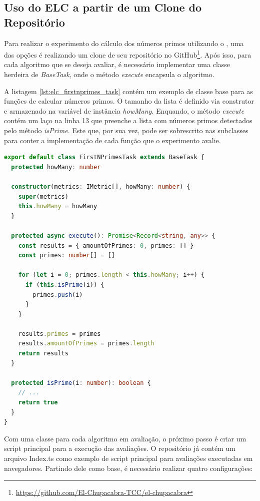 \documentclass[12pt]{tcc}
\begin{document}
	\subsection{Uso do ELC a partir de um Clone do Repositório}
	\label{subsection:study-case-cloning-elc}

	Para realizar o experimento do cálculo dos números primos utilizando o , uma das opções é realizando um clone de seu repositório no GitHub\footnote{\url{https://github.com/El-Chupacabra-TCC/el-chupacabra}}.
	Após isso, para cada algoritmo que se deseja avaliar, é necessário implementar uma classe herdeira de \emph{BaseTask}, onde o método \emph{execute} encapsula o algoritmo.

	A listagem \ref{lst:elc_firstnprimes_task} contém um exemplo de classe base para as funções de calcular números primos.
	O tamanho da lista é definido via construtor e armazenado na variável de instância \emph{howMany}.
	Enquando, o método \emph{execute} contém um laço na linha 13 que preenche a lista com números primos detectados pelo método \emph{isPrime}.
	Este que, por sua vez, pode ser sobrescrito nas subclasses para conter a implementação de cada função que o experimento avalie.

\begin{lstlisting}[label={lst:elc_firstnprimes_task}, caption={Exemplo de classe encapulando um algoritmo de cálculo de números primos.}, language=TypeScript, breaklines=true]
export default class FirstNPrimesTask extends BaseTask {
  protected howMany: number

  constructor(metrics: IMetric[], howMany: number) {
    super(metrics)
    this.howMany = howMany
  }

  protected async execute(): Promise<Record<string, any>> {
    const results = { amountOfPrimes: 0, primes: [] }
    const primes: number[] = []

    for (let i = 0; primes.length < this.howMany; i++) {
      if (this.isPrime(i)) {
        primes.push(i)
      }
    }

    results.primes = primes
    results.amountOfPrimes = primes.length
    return results
  }

  protected isPrime(i: number): boolean {
    // ...
    return true
  }
}
\end{lstlisting}

	Com uma classe para cada algoritmo em avaliação, o próximo passo é criar um script principal para a execução das avaliações.
	O repositório já contém um arquivo Index.ts como exemplo de script principal para avaliações executadas em navegadores.
	Partindo dele como base, é necessário realizar quatro configurações:
\end{document}

